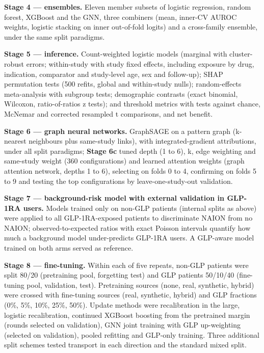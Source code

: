 \documentclass[
  11pt,
]{article}
\begin{document}
\textbf{Stage 4 --- ensembles.} Eleven member subsets of logistic
regression, random forest, XGBoost and the GNN, three combiners (mean,
inner-CV AUROC weights, logistic stacking on inner out-of-fold logits)
and a cross-family ensemble, under the same split paradigms.

\textbf{Stage 5 --- inference.} Count-weighted logistic models (marginal
with cluster-robust errors; within-study with study fixed effects,
including exposure by drug, indication, comparator and study-level age,
sex and follow-up); SHAP permutation tests (500 refits, global and
within-study nulls); random-effects meta-analysis with subgroup tests;
demographic contrasts (exact binomial, Wilcoxon, ratio-of-ratios z
tests); and threshold metrics with tests against chance, McNemar and
corrected resampled t comparisons, and net benefit.

\textbf{Stage 6 --- graph neural networks.} GraphSAGE on a pattern graph
(k-nearest neighbours plus same-study links), with integrated-gradient
attributions, under all split paradigms; \textbf{Stage 6c} tuned depth
(1 to 6), k, edge weighting and same-study weight (360 configurations)
and learned attention weights (graph attention network, depths 1 to 6),
selecting on folds 0 to 4, confirming on folds 5 to 9 and testing the
top configurations by leave-one-study-out validation.

\textbf{Stage 7 --- background-risk model with external validation in
GLP-1RA users.} Models trained only on non-GLP patients (internal splits
as above) were applied to all GLP-1RA-exposed patients to discriminate
NAION from no NAION; observed-to-expected ratios with exact Poisson
intervals quantify how much a background model under-predicts GLP-1RA
users. A GLP-aware model trained on both arms served as reference.

\textbf{Stage 8 --- fine-tuning.} Within each of five repeats, non-GLP
patients were split 80/20 (pretraining pool, forgetting test) and GLP
patients 50/10/40 (fine-tuning pool, validation, test). Pretraining
sources (none, real, synthetic, hybrid) were crossed with fine-tuning
sources (real, synthetic, hybrid) and GLP fractions (0\%, 5\%, 10\%,
25\%, 50\%). Update methods were recalibration in the large, logistic
recalibration, continued XGBoost boosting from the pretrained margin
(rounds selected on validation), GNN joint training with GLP
up-weighting (selected on validation), pooled refitting and GLP-only
training. Three additional split schemes tested transport in each
direction and the standard mixed split.
\end{document}
